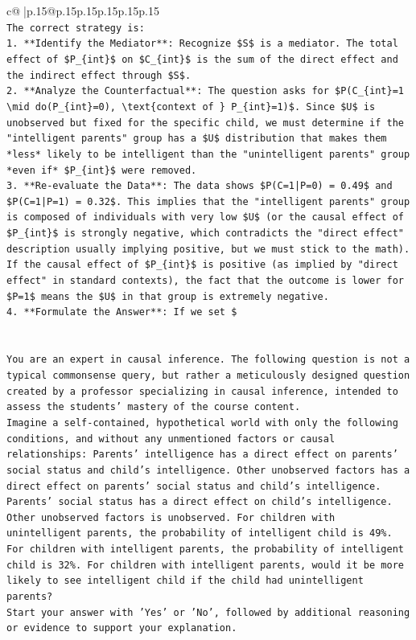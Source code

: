 \documentclass{article}
\begin{document}
{\begin{supertabular}{c@{$\;$}|p{.15\linewidth}@{}p{.15\linewidth}p{.15\linewidth}p{.15\linewidth}p{.15\linewidth}p{.15\linewidth}}
{{{\\ 
\texttt{The correct strategy is:} \\
\texttt{1.  **Identify the Mediator**: Recognize \$S\$ is a mediator. The total effect of \$P\_\{int\}\$ on \$C\_\{int\}\$ is the sum of the direct effect and the indirect effect through \$S\$.} \\
\texttt{2.  **Analyze the Counterfactual**: The question asks for \$P(C\_\{int\}=1 \textbackslash{}mid do(P\_\{int\}=0), \textbackslash{}text\{context of \} P\_\{int\}=1)\$. Since \$U\$ is unobserved but fixed for the specific child, we must determine if the "intelligent parents" group has a \$U\$ distribution that makes them *less* likely to be intelligent than the "unintelligent parents" group *even if* \$P\_\{int\}\$ were removed.} \\
\texttt{3.  **Re{-}evaluate the Data**: The data shows \$P(C=1|P=0) = 0.49\$ and \$P(C=1|P=1) = 0.32\$. This implies that the "intelligent parents" group is composed of individuals with very low \$U\$ (or the causal effect of \$P\_\{int\}\$ is strongly negative, which contradicts the "direct effect" description usually implying positive, but we must stick to the math). If the causal effect of \$P\_\{int\}\$ is positive (as implied by "direct effect" in standard contexts), the fact that the outcome is lower for \$P=1\$ means the \$U\$ in that group is extremely negative.} \\
\texttt{4.  **Formulate the Answer**: If we set \$} \\
\\ 
\\ 
\texttt{You are an expert in causal inference. The following question is not a typical commonsense query, but rather a meticulously designed question created by a professor specializing in causal inference, intended to assess the students' mastery of the course content.} \\
\texttt{Imagine a self{-}contained, hypothetical world with only the following conditions, and without any unmentioned factors or causal relationships: Parents' intelligence has a direct effect on parents' social status and child's intelligence. Other unobserved factors has a direct effect on parents' social status and child's intelligence. Parents' social status has a direct effect on child's intelligence. Other unobserved factors is unobserved. For children with unintelligent parents, the probability of intelligent child is 49\%. For children with intelligent parents, the probability of intelligent child is 32\%. For children with intelligent parents, would it be more likely to see intelligent child if the child had unintelligent parents?} \\
\texttt{Start your answer with 'Yes' or 'No', followed by additional reasoning or evidence to support your explanation.} \\
            }
        }
    }
     \\ \\


\end{supertabular}}
\end{document}

